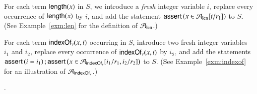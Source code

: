 \smallskip


For each term $\mathsf{length}(x)$ in $S$, we introduce a \emph{fresh} integer variable $i$, replace every occurrence of $\mathsf{length}(x)$ by $i$, and add the statement $\textsf{assert}\left(x \in \mathcal{A}_{\rm len}[i/r_1]\right)$ to $S$. (See Example~\ref{exm:len} for the definition of $\mathcal{A}_{\rm len}$.)  

For each term $\mathsf{indexOf}_v(x, i)$ occurring in $S$, introduce two fresh integer variables $i_1$ and $i_2$, replace every occurrence of $\mathsf{indexOf}_v(x, i)$ by $i_2$, and add the statements $\textsf{assert}\left(i=i_1\right); \textsf{assert}\left(x \in \mathcal{A}_{\mathsf{indexOf}_v}[i_1/r_1, i_2/r_2]\right)$ to $S$.  (See Example~\ref{exm:indexof} for an illustration of $\mathcal{A}_{\rm \mathsf{indexOf}_v}$.)

%
%

\medskip
{}.

\smallskip

